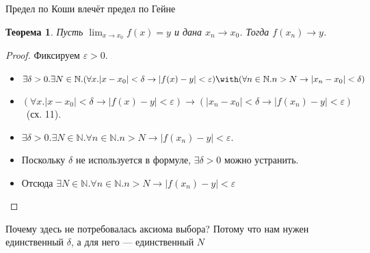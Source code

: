 \documentclass[aspectratio=169]{beamer}
\newtheorem{thm}{Теорема}[section]
\begin{document}
\begin{frame}{Предел по Коши влечёт предел по Гейне}
\begin{thm}Пусть $\lim_{x \rightarrow x_0} f(x) = y$ и дана $x_n \rightarrow x_0$.
Тогда $f(x_n) \rightarrow y$.\end{thm}

\begin{proof}
Фиксируем $\varepsilon > 0$.
\begin{itemize}
\item $\exists \delta > 0.\exists N\in\mathbb{N}.(\forall x.|x - x_0| < \delta \rightarrow |f(x) - y| < \varepsilon) \with
(\forall n\in\mathbb{N}.n > N \rightarrow |x_n - x_0|<\delta)$
\item $(\forall x.|x - x_0| < \delta \rightarrow |f(x) - y| < \varepsilon) \rightarrow (|x_n - x_0| < \delta \rightarrow |f(x_n) - y| < \varepsilon)$ \ (сх. 11).
\item $\exists \delta > 0.\exists N\in\mathbb{N}.\forall n\in\mathbb{N}.n > N\rightarrow |f(x_n) - y| < \varepsilon$.
\item Поскольку $\delta$ не используется в формуле, $\exists \delta > 0$ можно устранить.
\item Отсюда $\exists N\in\mathbb{N}.\forall n\in\mathbb{N}.n > N\rightarrow |f(x_n) - y| < \varepsilon$
\end{itemize}
\end{proof}\pause

Почему здесь не потребовалась аксиома выбора? Потому что нам нужен единственный $\delta$, а для него --- 
единственный $N$

\end{frame}
\end{document}
